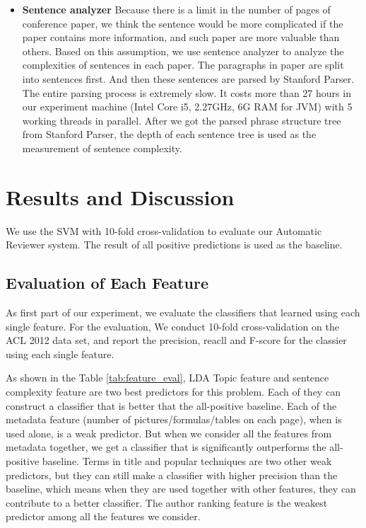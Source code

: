 \documentclass[11pt,letterpaper]{article}
\begin{document}
\begin{itemize}
\item	{\bf Sentence analyzer}
Because there is a limit in the number of pages of conference paper, we think the sentence would be more complicated if the paper contains more information, and such paper are more valuable than others. Based on this assumption, we use sentence analyzer to analyze the complexities of sentences in each paper. The paragraphs in paper are split into sentences first. And then these sentences are parsed by Stanford Parser. The entire parsing process is extremely slow. It costs more than 27 hours in our experiment machine (Intel Core i5, 2.27GHz, 6G RAM for JVM) with 5 working threads in parallel. After we got the parsed phrase structure tree from Stanford Parser, the depth of each sentence tree is used as the measurement of sentence complexity. 

\end{itemize} 









\section{Results and Discussion}
We use the SVM with 10-fold cross-validation to evaluate our Automatic Reviewer system. The result of all positive predictions is used as the baseline. 


\subsection{Evaluation of Each Feature}
\label{sec:feature_eval}
As first part of our experiment, 
we evaluate the classifiers that learned using each single feature.
For the evaluation,
We conduct 10-fold cross-validation on the ACL 2012 data set,
and report the precision, reacll and F-score for the classier using each single feature.

As shown in the Table \ref{tab:feature_eval},
LDA Topic feature and sentence complexity feature are two best predictors for this problem.
Each of they can construct a classifier that is better that the all-positive baseline.
Each of the metadata feature (number of pictures/formulas/tables on each page),
when is used alone, is a weak predictor.
But when we consider all the features from metadata together,
we get a classifier that is significantly outperforms the all-positive baseline.
Terms in title and popular techniques are two other weak predictors,
but they can still make a classifier with higher precision than the baseline,
which means when they are used together with other features, they can contribute to a better classifier.
The author ranking feature is the weakest predictor among all the features we consider.
\end{document}
